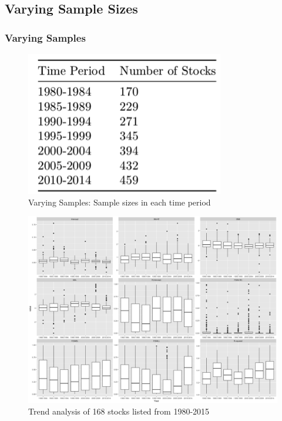 \documentclass{beamer}
\begin{document}
\subsection{Varying Sample Sizes}
\begin{frame}
\frametitle{Varying Samples}
\begin{figure}
\centering
\includegraphics[scale=1.15]{samplestable.png}
\caption{Varying Samples: Sample sizes in each time period}
\end{figure}

\end{frame}

\begin{frame}
\begin{figure}
\centering
\includegraphics[scale=.16]{3SP500-1980-2015-168-stock.png}
\caption{Trend analysis of 168 stocks listed from 1980-2015}
\end{figure}

\end{frame}
\end{document}
